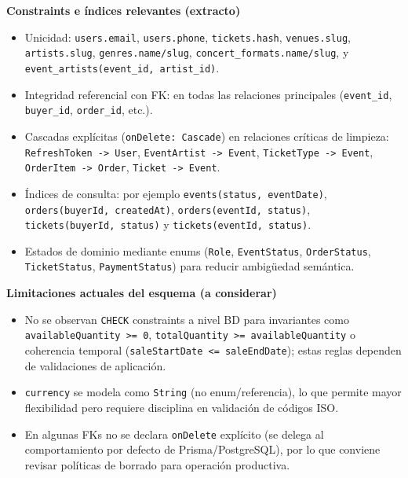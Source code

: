 \documentclass[
  11pt,
  a4paper,
  twoside=false,
  parskip=half               %
]{scrreprt}                  %
\providecommand{\tightlist}{%
  \setlength{\itemsep}{0pt}\setlength{\parskip}{0pt}}
\begin{document}
\textbf{Constraints e índices relevantes (extracto)}

\begin{itemize}
\tightlist
\item
  Unicidad: \texttt{users.email}, \texttt{users.phone},
  \texttt{tickets.hash}, \texttt{venues.slug}, \texttt{artists.slug},
  \texttt{genres.name/slug}, \texttt{concert\_formats.name/slug}, y
  \texttt{event\_artists(event\_id,\ artist\_id)}.
\item
  Integridad referencial con FK: en todas las relaciones principales
  (\texttt{event\_id}, \texttt{buyer\_id}, \texttt{order\_id}, etc.).
\item
  Cascadas explícitas (\texttt{onDelete:\ Cascade}) en relaciones
  críticas de limpieza: \texttt{RefreshToken\ -\textgreater{}\ User},
  \texttt{EventArtist\ -\textgreater{}\ Event},
  \texttt{TicketType\ -\textgreater{}\ Event},
  \texttt{OrderItem\ -\textgreater{}\ Order},
  \texttt{Ticket\ -\textgreater{}\ Event}.
\item
  Índices de consulta: por ejemplo \texttt{events(status,\ eventDate)},
  \texttt{orders(buyerId,\ createdAt)},
  \texttt{orders(eventId,\ status)}, \texttt{tickets(buyerId,\ status)}
  y \texttt{tickets(eventId,\ status)}.
\item
  Estados de dominio mediante enums (\texttt{Role},
  \texttt{EventStatus}, \texttt{OrderStatus}, \texttt{TicketStatus},
  \texttt{PaymentStatus}) para reducir ambigüedad semántica.
\end{itemize}

\textbf{Limitaciones actuales del esquema (a considerar)}

\begin{itemize}
\tightlist
\item
  No se observan \texttt{CHECK} constraints a nivel BD para invariantes
  como \texttt{availableQuantity\ \textgreater{}=\ 0},
  \texttt{totalQuantity\ \textgreater{}=\ availableQuantity} o
  coherencia temporal
  (\texttt{saleStartDate\ \textless{}=\ saleEndDate}); estas reglas
  dependen de validaciones de aplicación.
\item
  \texttt{currency} se modela como \texttt{String} (no enum/referencia),
  lo que permite mayor flexibilidad pero requiere disciplina en
  validación de códigos ISO.
\item
  En algunas FKs no se declara \texttt{onDelete} explícito (se delega al
  comportamiento por defecto de Prisma/PostgreSQL), por lo que conviene
  revisar políticas de borrado para operación productiva.
\end{itemize}
\end{document}
